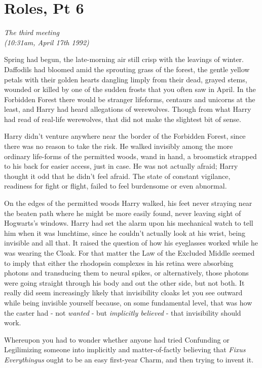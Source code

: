 \chapter{Roles, Pt 6}

\emph{The third meeting\\ (10:31am, April 17th 1992)}

Spring had begun, the late-morning air still crisp with the leavings of
winter. Daffodils had bloomed amid the sprouting grass of the forest,
the gentle yellow petals with their golden hearts dangling limply from
their dead, grayed stems, wounded or killed by one of the sudden frosts
that you often saw in April. In the Forbidden Forest there would be
stranger lifeforms, centaurs and unicorns at the least, and Harry had
heard allegations of werewolves. Though from what Harry had read of
real-life werewolves, that did not make the slightest bit of sense.

Harry didn't venture anywhere near the border of the Forbidden Forest,
since there was no reason to take the risk. He walked invisibly among
the more ordinary life-forms of the permitted woods, wand in hand, a
broomstick strapped to his back for easier access, just in case. He was
not actually afraid; Harry thought it odd that he didn't feel afraid.
The state of constant vigilance, readiness for fight or flight, failed
to feel burdensome or even abnormal.

On the edges of the permitted woods Harry walked, his feet never
straying near the beaten path where he might be more easily found, never
leaving sight of Hogwarts's windows. Harry had set the alarm upon his
mechanical watch to tell him when it was lunchtime, since he couldn't
actually look at his wrist, being invisible and all that. It raised the
question of how his eyeglasses worked while he was wearing the Cloak.
For that matter the Law of the Excluded Middle seemed to imply that
either the rhodopsin complexes in his retina were absorbing photons and
transducing them to neural spikes, or alternatively, those photons were
going straight through his body and out the other side, but not both. It
really did seem increasingly likely that invisibility cloaks let you see
outward while being invisible yourself because, on some fundamental
level, that was how the caster had - not \emph{wanted} - but
\emph{implicitly believed} - that invisibility should work.

Whereupon you had to wonder whether anyone had tried Confunding or
Legilimizing someone into implicitly and matter-of-factly believing that
\emph{Fixus Everythingus} ought to be an easy first-year Charm, and then
trying to invent it.

